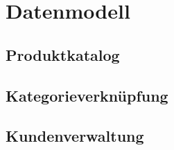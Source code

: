 \chapter{Datenmodell}

\section{Produktkatalog}
\lipsum[1-4]

\section{Kategorieverknüpfung}
\lipsum[5-8]

\section{Kundenverwaltung}
\lipsum[9-12]